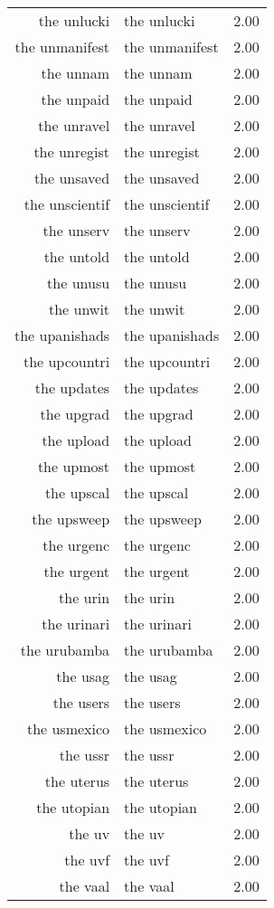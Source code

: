 \begin{table}[ht]
\begin{tabular}{rlr}
  the unlucki & the unlucki & 2.00 \\ 
  the unmanifest & the unmanifest & 2.00 \\ 
  the unnam & the unnam & 2.00 \\ 
  the unpaid & the unpaid & 2.00 \\ 
  the unravel & the unravel & 2.00 \\ 
  the unregist & the unregist & 2.00 \\ 
  the unsaved & the unsaved & 2.00 \\ 
  the unscientif & the unscientif & 2.00 \\ 
  the unserv & the unserv & 2.00 \\ 
  the untold & the untold & 2.00 \\ 
  the unusu & the unusu & 2.00 \\ 
  the unwit & the unwit & 2.00 \\ 
  the upanishads & the upanishads & 2.00 \\ 
  the upcountri & the upcountri & 2.00 \\ 
  the updates & the updates & 2.00 \\ 
  the upgrad & the upgrad & 2.00 \\ 
  the upload & the upload & 2.00 \\ 
  the upmost & the upmost & 2.00 \\ 
  the upscal & the upscal & 2.00 \\ 
  the upsweep & the upsweep & 2.00 \\ 
  the urgenc & the urgenc & 2.00 \\ 
  the urgent & the urgent & 2.00 \\ 
  the urin & the urin & 2.00 \\ 
  the urinari & the urinari & 2.00 \\ 
  the urubamba & the urubamba & 2.00 \\ 
  the usag & the usag & 2.00 \\ 
  the users & the users & 2.00 \\ 
  the usmexico & the usmexico & 2.00 \\ 
  the ussr & the ussr & 2.00 \\ 
  the uterus & the uterus & 2.00 \\ 
  the utopian & the utopian & 2.00 \\ 
  the uv & the uv & 2.00 \\ 
  the uvf & the uvf & 2.00 \\ 
  the vaal & the vaal & 2.00 \\ 

\end{tabular}
\end{table}
